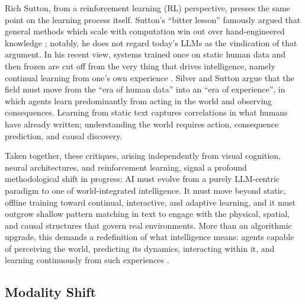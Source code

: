 Rich Sutton, from a reinforcement learning (RL) perspective, presses the same point on the learning process itself.
Sutton's ``bitter lesson'' famously argued that general methods which scale with computation win out over hand-engineered knowledge \cite{sutton2019bitter}; notably, he does not regard today's LLMs as the vindication of that argument.
In his recent view, systems trained once on static human data and then frozen are cut off from the very thing that drives intelligence, namely continual learning from one's own experience \cite{silver2025era}.
Silver and Sutton argue that the field must move from the ``era of human data'' into an ``era of experience'', in which agents learn predominantly from acting in the world and observing consequences.
Learning from static text captures correlations in what humans have already written; understanding the world requires action, consequence prediction, and causal discovery.




Taken together, these critiques, arising independently from visual cognition, neural architectures, and reinforcement learning, signal a profound methodological shift in progress: AI must evolve from a purely LLM-centric paradigm to one of world-integrated intelligence.
It must move beyond static, offline training toward continual, interactive, and adaptive learning, and it must outgrow shallow pattern matching in text to engage with the physical, spatial, and causal structures that govern real environments.
More than an algorithmic upgrade, this demands a redefinition of what intelligence means: agents capable of perceiving the world, predicting its dynamics, interacting within it, and learning continuously from such experiences \cite{bengio2017consciousness,yao2022react,hao2023reasoning}.








\subsection{Modality Shift}
\label{subsec:modality-shift}

